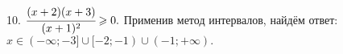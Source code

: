 10. $\cfrac{(x+2)(x+3)}{(x+1)^2}\geqslant0.$ Применив метод интервалов, найдём ответ: $x\in(-\infty;-3]\cup[-2;-1)\cup(-1;+\infty).$
\begin{figure}[ht!]
\end{figure}\\
